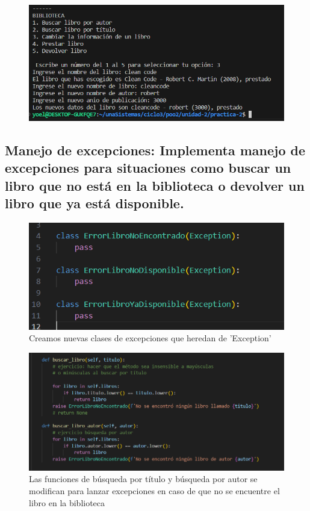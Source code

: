 \documentclass[11pt,a4paper]{article}
\begin{document}
\begin{figure}[H]
    \centering
    \includegraphics[width=0.8\linewidth]{images/7-comp.png}
    \caption{}
    \label{fig:enter-label}
\end{figure}
	
\subsection{Manejo de excepciones:
Implementa manejo de excepciones para situaciones como buscar un libro que no está en la biblioteca o devolver un libro que ya está disponible.}

\begin{figure}[H]
    \centering
    \includegraphics[width=0.5\linewidth]{images/8-1.png}
    \caption{Creamos nuevas clases de excepciones que heredan de 'Exception'}
    \label{fig:enter-label}
\end{figure}

\begin{figure}[H]
    \centering
    \includegraphics[width=1\linewidth]{images/8-2.png}
    \caption{Las funciones de búsqueda por título y búsqueda por autor se modifican para lanzar excepciones en caso de que no se encuentre el libro en la biblioteca}
    \label{fig:enter-label}
\end{figure}
\end{document}
